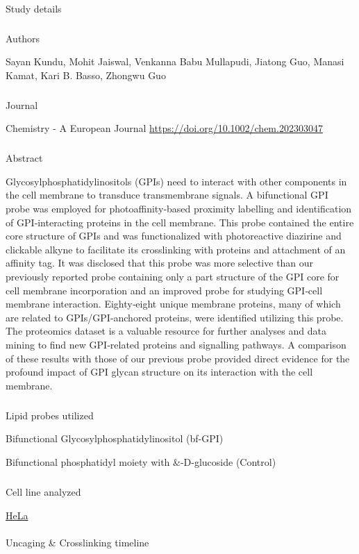 \documentclass[
  letterpaper,
  DIV=11,
  numbers=noendperiod]{scrartcl}
\author{}
\date{}
\makeatletter
\let\oldparagraph\paragraph
\renewcommand{\paragraph}{
    \@ifstar
      \xxxParagraphStar
      \xxxParagraphNoStar
  }
\newcommand{\xxxParagraphStar}[1]{\oldparagraph*{#1}\mbox{}}
\newcommand{\xxxParagraphNoStar}[1]{\oldparagraph{#1}\mbox{}}
\let\oldsubparagraph\subparagraph
\renewcommand{\subparagraph}{
    \@ifstar
      \xxxSubParagraphStar
      \xxxSubParagraphNoStar
  }
\newcommand{\xxxSubParagraphStar}[1]{\oldsubparagraph*{#1}\mbox{}}
\newcommand{\xxxSubParagraphNoStar}[1]{\oldsubparagraph{#1}\mbox{}}
\makeatother
\begin{document}
\paragraph{Study details}\label{study-details}

\subparagraph{Authors}\label{authors}

Sayan Kundu, Mohit Jaiswal, Venkanna Babu Mullapudi, Jiatong Guo, Manasi
Kamat, Kari B. Basso, Zhongwu Guo

\subparagraph{Journal}\label{journal}

Chemistry - A European Journal
\url{https://doi.org/10.1002/chem.202303047}

\subparagraph{Abstract}\label{abstract}

Glycosylphosphatidylinositols (GPIs) need to interact with other
components in the cell membrane to transduce transmembrane signals. A
bifunctional GPI probe was employed for photoaffinity‐based proximity
labelling and identification of GPI‐interacting proteins in the cell
membrane. This probe contained the entire core structure of GPIs and was
functionalized with photoreactive diazirine and clickable alkyne to
facilitate its crosslinking with proteins and attachment of an affinity
tag. It was disclosed that this probe was more selective than our
previously reported probe containing only a part structure of the GPI
core for cell membrane incorporation and an improved probe for studying
GPI‐cell membrane interaction. Eighty‐eight unique membrane proteins,
many of which are related to GPIs/GPI‐anchored proteins, were identified
utilizing this probe. The proteomics dataset is a valuable resource for
further analyses and data mining to find new GPI‐related proteins and
signalling pathways. A comparison of these results with those of our
previous probe provided direct evidence for the profound impact of GPI
glycan structure on its interaction with the cell membrane.

\subparagraph{Lipid probes utilized}\label{lipid-probes-utilized}

Bifunctional Glycosylphosphatidylinositol (bf-GPI)

Bifunctional phosphatidyl moiety with \alpha\&-D-glucoside (Control)

\subparagraph{Cell line analyzed}\label{cell-line-analyzed}

\href{https://www.atcc.org/products/ccl-2}{HeLa}

\paragraph{Uncaging \& Crosslinking
timeline}\label{uncaging-crosslinking-timeline}
\end{document}
